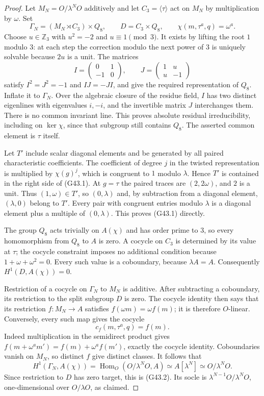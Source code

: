 \begin{proof}
Let $M_N=O/\lambda^N O$ additively and let $C_3=\langle
\tau\rangle$ act on $M_N$ by multiplication by $\omega$.
Set
\[
 \Gamma_N=(M_N\rtimes C_3)\times Q_8,
 \qquad D=C_3\times Q_8,
 \qquad \chi(m,\tau^a,q)=\omega^a.
\]
Choose $u\in\mathbb Z_3$ with $u^2=-2$ and $u\equiv1\pmod3$.
It exists by lifting the root $1$ modulo $3$: at each
step the correction modulo the next power of $3$ is
uniquely solvable because $2u$ is a unit.  The matrices
\[
 I=\begin{pmatrix}0&1\\-1&0\end{pmatrix},\qquad
 J=\begin{pmatrix}1&u\\u&-1\end{pmatrix}
\]
satisfy $I^2=J^2=-1$ and $IJ=-JI$, and give the required
representation of $Q_8$.  Inflate it to $\Gamma_N$.
Over the algebraic closure of the residue field, $I$
has two distinct eigenlines with eigenvalues $i,-i$,
and the invertible matrix $J$ interchanges them.
There is no common invariant line.  This proves
absolute residual irreducibility, including on
$\ker\chi$, since that subgroup still contains $Q_8$.
The asserted common element is $\tau$ itself.

Let $T'$ include scalar diagonal elements and be
generated by all paired characteristic coefficients.
The coefficient of degree $j$ in the twisted
representation is multiplied by $\chi(g)^j$, which
is congruent to $1$ modulo $\lambda$.  Hence $T'$ is
contained in the right side of (G43.1).  At $g=\tau$
the paired traces are $(2,2\omega)$, and $2$ is a
unit.  Thus $(1,\omega)\in T'$, so $(0,\lambda)$
and, by subtraction from a diagonal element,
$(\lambda,0)$ belong to $T'$.  Every pair with
congruent entries modulo $\lambda$ is a diagonal
element plus a multiple of $(0,\lambda)$.
This proves (G43.1) directly.

The group $Q_8$ acts trivially on $A(\chi)$ and has
order prime to $3$, so every homomorphism from $Q_8$
to $A$ is zero.  A cocycle on $C_3$ is determined by
its value at $\tau$; the cocycle constraint imposes
no additional condition because $1+\omega+\omega^2=0$.
Every such value is a coboundary, because
$\lambda A=A$.  Consequently $H^1(D,A(\chi))=0$.

Restriction of a cocycle on $\Gamma_N$ to $M_N$ is
additive.  After subtracting a coboundary, its
restriction to the split subgroup $D$ is zero.
The cocycle identity then says that its restriction
$f:M_N\to A$ satisfies $f(\omega m)=\omega f(m)$;
it is therefore $O$-linear.  Conversely, every such
map gives the cocycle
\[
                    c_f(m,\tau^a,q)=f(m).
\]
Indeed multiplication in the semidirect product gives
$f(m+\omega^a m')=f(m)+\omega^a f(m')$, exactly the
cocycle identity.  Coboundaries vanish on $M_N$, so
distinct $f$ give distinct classes.  It follows that
\[
 H^1(\Gamma_N,A(\chi))
   =\operatorname{Hom}_O(O/\lambda^N O,A)
   \simeq A[\lambda^N]\simeq O/\lambda^N O.
\]
Since restriction to $D$ has zero target, this is
(G43.2).  Its socle is $\lambda^{N-1}O/\lambda^N O$,
one-dimensional over $O/\lambda O$, as claimed.
\end{proof}

